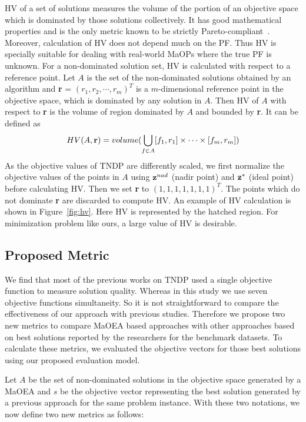 HV of a set of solutions measures the volume of the portion of an objective space which is dominated by those solutions collectively. It has good mathematical properties and is the only metric known to be strictly Pareto-compliant~\cite{zitzler2003performance}.  Moreover, calculation of HV does not depend much on the PF. Thus HV is specially suitable for dealing with real-world MaOPs where the true PF is unknown. For a non-dominated solution set, HV is calculated with respect to a reference point. Let $A$ is the set of the non-dominated solutions obtained by an algorithm and {\bf r} = $(r_1,r_2,\cdots,r_m)^T$ is a $m$-dimensional reference point in the objective space, which is dominated by any solution in  $A$. Then HV of $A$ with respect to {\bf r} is the volume of region dominated by $A$ and bounded by {\bf r}. It can be defined as
\begin{equation}
HV(A,{\bf r}) = volume(\bigcup\limits_{f\in A}[f_1,r_1]\times\cdots\times[f_m,r_m])
\label{eq:hv}
\end{equation}
As the objective values of TNDP are differently scaled, we first normalize the objective values of the points in $A$ using ${\bf z}^{nad}$ (nadir point) and ${\bf z}^{*}$ (ideal point) before calculating HV. Then we set {\bf r} to $(1, 1, 1, 1, 1, 1, 1)^T$. The points which do not dominate {\bf r} are discarded to compute HV. An example of HV calculation is shown in Figure~\ref{fig:hv}. Here HV is represented by the hatched region. For minimization problem like ours, a large value of HV is desirable. 


\subsection{Proposed Metric}
\label{sec:new_metric}

We find that most of the previous works on TNDP used a single objective function to measure solution quality. Whereas in this study we use seven objective functions simultaneity. So it is not straightforward to compare the effectiveness of our approach with previous studies. Therefore we propose two new metrics to compare MaOEA based approaches with other approaches based on best solutions reported by the researchers for the benchmark datasets.  To calculate these metrics, we evaluated the objective vectors for those best solutions using our proposed evaluation model.

Let $A$ be the set of non-dominated solutions in the objective space generated by a MaOEA and $s$ be the objective vector representing the best solution generated by a previous approach for the same problem instance. With these two notations, we now define two new metrics as follows:

